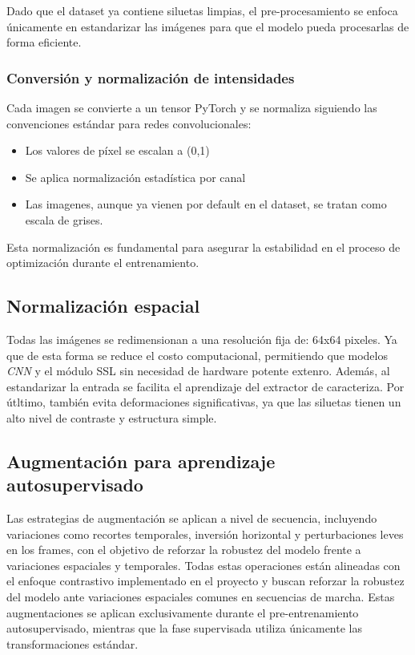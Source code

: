 Dado que el dataset ya contiene siluetas limpias, el pre-procesamiento se enfoca únicamente en estandarizar las imágenes para que el modelo pueda procesarlas de forma eficiente.

\subsubsection{Conversión y normalización de intensidades}

Cada imagen se convierte a un tensor PyTorch y se normaliza siguiendo las convenciones estándar para redes convolucionales:

\begin{itemize}
    \item Los valores de píxel se escalan a (0,1)
    \item Se aplica normalización estadística por canal
    \item Las imagenes, aunque ya vienen por default en el dataset, se tratan como escala de grises.
\end{itemize}

Esta normalización es fundamental para asegurar la estabilidad en el proceso de optimización durante el entrenamiento.

\subsection{Normalización espacial}

Todas las imágenes se redimensionan a una resolución fija de: 64x64 pixeles. Ya que de esta forma se reduce el costo computacional, permitiendo que modelos \textit{CNN} y el módulo SSL sin necesidad de hardware potente extenro. Además, al estandarizar la entrada se facilita el aprendizaje del extractor de caracteriza. Por útltimo, también evita deformaciones significativas, ya que las siluetas tienen un alto nivel de contraste y estructura simple.

\subsection{Augmentación para aprendizaje autosupervisado}

Las estrategias de augmentación se aplican a nivel de secuencia, incluyendo variaciones como recortes temporales, inversión horizontal y perturbaciones leves en los frames, con el objetivo de reforzar la robustez del modelo frente a variaciones espaciales y temporales. Todas estas operaciones están alineadas con el enfoque contrastivo implementado en el proyecto y buscan reforzar la robustez del modelo ante variaciones espaciales comunes en secuencias de marcha. Estas augmentaciones se aplican exclusivamente durante el pre-entrenamiento autosupervisado, mientras que la fase supervisada utiliza únicamente las transformaciones estándar.

